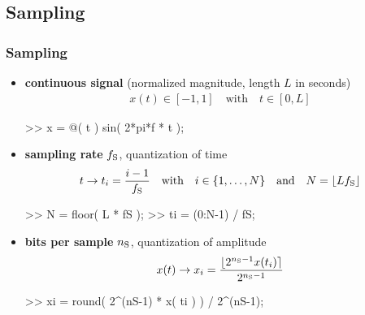 
\subsection{Sampling}

\begin{frame}[fragile] %
	\frametitle{Sampling}
	\begin{itemize}
		\item \textbf{continuous signal} (normalized magnitude, length $L$ in seconds)
			\begin{align*}
				x(t)\in[-1,1]\quad\textrm{with}\quad t\in[0,L]
			\end{align*}
			\begin{code}
>> x = @( t ) sin( 2*pi*f * t ); \color{medium}%
			\end{code}
		\item \textbf{sampling rate} $f_{\textrm S}$, quantization of time
			\begin{align*}
				t\rightarrow t_i=\frac{i-1}{f_{\textrm S}}\quad\textrm{with}\quad i\in\{1,\ldots,N\}\quad\textrm{and}\quad N=\lfloor Lf_{\textrm S}\rfloor
			\end{align*}
			\begin{code}
>> N = floor( L * fS ); \color{medium}%
>> ti = (0:N-1) / fS; \color{medium}%
			\end{code}
		\item \textbf{bits per sample} $n_{\textrm S}$, quantization of amplitude
			\begin{align*}
				x(t)\rightarrow x_i=\frac{\lfloor2^{n_{\textrm S}-1}x(t_i)\rceil}{2^{n_{\textrm S}-1}}
			\end{align*}
			\begin{code}
>> xi = round( 2^(nS-1) * x( ti ) ) / 2^(nS-1); \color{medium}%
			\end{code}
	\end{itemize}
\end{frame}

